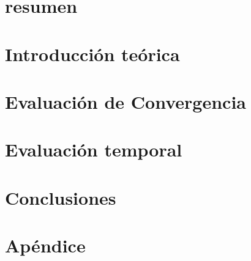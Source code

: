 


 



\section*{resumen}


\vspace{2em}
\tableofcontents
\newpage

\section{Introducción teórica}

\newpage

%

\section{Evaluación de Convergencia}

\newpage

\section{Evaluación temporal}

\newpage

\section{Conclusiones}

\newpage

\section{Apéndice}


%
%


